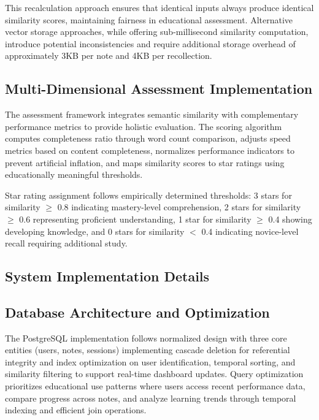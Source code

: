 {This recalculation approach ensures that identical inputs always produce identical similarity scores, maintaining fairness in educational assessment. Alternative vector storage approaches, while offering sub-millisecond similarity computation, introduce potential inconsistencies and require additional storage overhead of approximately 3KB per note and 4KB per recollection.

\subsection{Multi-Dimensional Assessment Implementation}

The assessment framework integrates semantic similarity with complementary performance metrics to provide holistic evaluation. The scoring algorithm computes completeness ratio through word count comparison, adjusts speed metrics based on content completeness, normalizes performance indicators to prevent artificial inflation, and maps similarity scores to star ratings using educationally meaningful thresholds.

Star rating assignment follows empirically determined thresholds: 3 stars for similarity $\geq$ 0.8 indicating mastery-level comprehension, 2 stars for similarity $\geq$ 0.6 representing proficient understanding, 1 star for similarity $\geq$ 0.4 showing developing knowledge, and 0 stars for similarity $<$ 0.4 indicating novice-level recall requiring additional study.

{\color{maroon}
\subsection{System Implementation Details}

\subsection{Database Architecture and Optimization}

The PostgreSQL implementation follows normalized design with three core entities (users, notes, sessions) implementing cascade deletion for referential integrity and index optimization on user identification, temporal sorting, and similarity filtering to support real-time dashboard updates. Query optimization prioritizes educational use patterns where users access recent performance data, compare progress across notes, and analyze learning trends through temporal indexing and efficient join operations.

}}
